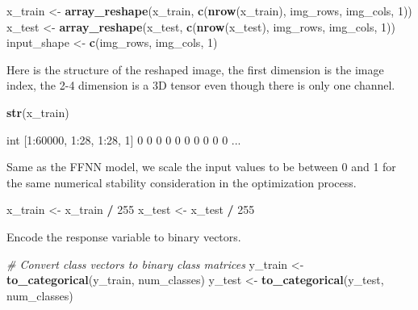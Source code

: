\documentclass[12pt,]{krantz}
\makeatletter
\newenvironment{Shaded}{\begin{snugshade}}{\end{snugshade}}
\newcommand{\CommentTok}[1]{\textcolor[rgb]{0.37,0.37,0.37}{\textit{#1}}}
\newcommand{\DecValTok}[1]{\textcolor[rgb]{0.06,0.06,0.06}{#1}}
\newcommand{\KeywordTok}[1]{\textcolor[rgb]{0.27,0.27,0.27}{\textbf{#1}}}
\newcommand{\NormalTok}[1]{#1}
\newcommand{\OperatorTok}[1]{\textcolor[rgb]{0.43,0.43,0.43}{\textbf{#1}}}
\newcommand{\StringTok}[1]{\textcolor[rgb]{0.5,0.5,0.5}{#1}}
\newenvironment{kframe}{%
\medskip{}
\setlength{\fboxsep}{.8em}
 \def\at@end@of@kframe{}%
 \ifinner\ifhmode%
  \def\at@end@of@kframe{\end{minipage}}%
  \begin{minipage}{\columnwidth}%
 \fi\fi%
 \def\FrameCommand##1{\hskip\@totalleftmargin \hskip-\fboxsep
 \colorbox{shadecolor}{##1}\hskip-\fboxsep
     \hskip-\linewidth \hskip-\@totalleftmargin \hskip\columnwidth}%
 \MakeFramed {\advance\hsize-\width
   \@totalleftmargin\z@ \linewidth\hsize
   \@setminipage}}%
 {\par\unskip\endMakeFramed%
 \at@end@of@kframe}
\renewenvironment{Shaded}{\begin{kframe}}{\end{kframe}}
\makeatother
\begin{document}
\begin{Shaded}
\begin{Highlighting}[]
\NormalTok{x_train <-}\StringTok{ }\KeywordTok{array_reshape}\NormalTok{(x_train,}
                         \KeywordTok{c}\NormalTok{(}\KeywordTok{nrow}\NormalTok{(x_train), img_rows, img_cols, }\DecValTok{1}\NormalTok{))}
\NormalTok{x_test <-}\StringTok{ }\KeywordTok{array_reshape}\NormalTok{(x_test,}
                         \KeywordTok{c}\NormalTok{(}\KeywordTok{nrow}\NormalTok{(x_test), img_rows, img_cols, }\DecValTok{1}\NormalTok{))}
\NormalTok{input_shape <-}\StringTok{ }\KeywordTok{c}\NormalTok{(img_rows, img_cols, }\DecValTok{1}\NormalTok{)}
\end{Highlighting}
\end{Shaded}

Here is the structure of the reshaped image, the first dimension is the image index, the 2-4 dimension is a 3D tensor even though there is only one channel.

\begin{Shaded}
\begin{Highlighting}[]
\KeywordTok{str}\NormalTok{(x_train)}
\end{Highlighting}
\end{Shaded}

\begin{Shaded}
\begin{Highlighting}[]
\NormalTok{int [1:60000, 1:28, 1:28, 1] 0 0 0 0 0 0 0 0 0 0 ...}
\end{Highlighting}
\end{Shaded}

Same as the FFNN model, we scale the input values to be between 0 and 1 for the same numerical stability consideration in the optimization process.

\begin{Shaded}
\begin{Highlighting}[]
\NormalTok{x_train <-}\StringTok{ }\NormalTok{x_train }\OperatorTok{/}\StringTok{ }\DecValTok{255}
\NormalTok{x_test <-}\StringTok{ }\NormalTok{x_test }\OperatorTok{/}\StringTok{ }\DecValTok{255}
\end{Highlighting}
\end{Shaded}

Encode the response variable to binary vectors.

\begin{Shaded}
\begin{Highlighting}[]
\CommentTok{# Convert class vectors to binary class matrices}
\NormalTok{y_train <-}\StringTok{ }\KeywordTok{to_categorical}\NormalTok{(y_train, num_classes)}
\NormalTok{y_test <-}\StringTok{ }\KeywordTok{to_categorical}\NormalTok{(y_test, num_classes)}
\end{Highlighting}
\end{Shaded}
\end{document}
